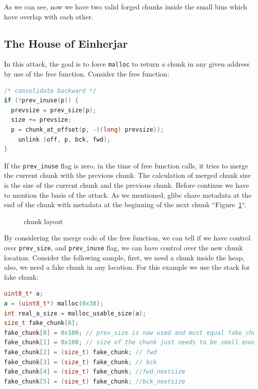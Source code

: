 \documentclass{masterthesis}
\newcommand*\libc{glibc}
\newcommand*\sbs{small bins}
\newcommand*\mallocc{\lstinline{malloc}}
\begin{document}
As we can see, now we have two valid forged chunks inside the \sbs{} which have overlap with each other.

\subsection{The House of Einherjar}
In this attack, the goal is to force \mallocc{} to return a chunk in any given address by use of the free function. Consider the free function:

\begin{lstlisting}[language=c,frame=tlrb]
/* consolidate backward */
if (!prev_inuse(p)) {
  prevsize = prev_size(p);
  size += prevsize;
  p = chunk_at_offset(p, -((long) prevsize));
	unlink (off, p, bck, fwd);
}
 \end{lstlisting}
If the \lstinline{prev_inuse} flag is zero, in the time of free function calls, it tries to merge the current chunk with the previous chunk. The calculation of merged chunk size is the size of the current chunk and the previous chunk. Before continue we have to mention the basis of the attack. As we mentioned, \libc{} share metadata at the end of the chunk with metadata at the beginning of the next chunk ``Figure~\ref{fig:gdb10}``.

\begin{figure}[h!]
 \caption{chunk layout}
 \label{fig:gdb10}
\end{figure}

By considering the merge code of the free function, we can tell if we have control over \lstinline{prev_size}, and \lstinline{prev_inuse} flag, we can have control over the new chunk location.
Consider the following sample, first, we need a chunk inside the heap, also, we need a fake chunk in any location. For this example we use the stack for fake chunk:
\begin{lstlisting}[language=c,frame=tlrb]
uint8_t* a;
a = (uint8_t*) malloc(0x38);
int real_a_size = malloc_usable_size(a);
size_t fake_chunk[6];
fake_chunk[0] = 0x100; // prev_size is now used and must equal fake_chunk's size to pass P->bk->size == P->prev_size
fake_chunk[1] = 0x100; // size of the chunk just needs to be small enough to stay in the \sbs{}
fake_chunk[2] = (size_t) fake_chunk; // fwd
fake_chunk[3] = (size_t) fake_chunk; // bck
fake_chunk[4] = (size_t) fake_chunk; //fwd_nextsize
fake_chunk[5] = (size_t) fake_chunk; //bck_nextsize
 \end{lstlisting}
\end{document}
